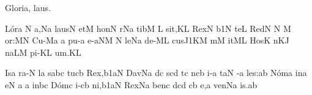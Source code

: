 \beginhymn Gloria, laus.


\Internote
\nosolesmescustos
\initiumgregorianum
%
\sgn L{\'o}r\punctum a\egn
{}\punctum N\egn
\sgn {}a{,}\pes Na\egn
\spatium
\sgn l{au}s\bivirga N\egn
\spatium
\sgn {}et\punctum M\egn
\spatium
\sgn h{o}n\punctum N\egn
{}r\pes Na\egn
\spatium
\sgn t{i}b\punctum M\egn
{}\punctum L\egn
\spatium
\sgn si{t,}\punctum K\augmentum L\egn
\spatium
\divisiominima
\spatium
\sgn Rex\punctum N\egn
\spatium
{}\episem b1\punctum N\egn
\sgn te{}\punctum L\egn
\spatium
\sgn Red\punctum N\egn
{}\bivirga N\egn
\custos M
\lineaproxima
{}o{r:}\engl{}\punctum M\augmentum N\egn
\spatium
\divisiomaior
\spatium
\sgn C{u}{-}\pes Ma\egn
{}\punctum a\egn
\spatium
\sgn pu{-}\punctum a\egn
\sgn {}e{-}\climacus aNM\egn
{}\punctum N\egn
\sgn le{}\pes Na\egn
\spatium
\sgn d{e}-\clivis ML\egn
\sgn cu{s}\episem J1\pes KM\egn
\spatium
\divisiominima
\spatium
m\punctum M\egn
{}it\clivis ML\egn
\spatium
\sgn Hos\punctum K\egn
{}n\cephalicus KJ\egn
\sgn na{}\pes LM\egn
\spatium
\sgn p{i}-\punctum K\augmentum L\egn
\sgn {}u{m.}\punctum K\augmentum L\egn
\spatium
\Finisgregoriana


\bigskip

\nosolesmescustos
\initiumgregorianum
%
\sgn {}Is\punctum a\egn
\sgn ra-\punctum N\egn
{}l\punctum a\egn
\spatium
{}s\punctum a\nonspatium\quilismapes bc\egn
\spatium
\sgn tu{}\clivis cb\egn
\spatium
\sgn Re{x,}\episem b1\clivis aN\egn
\spatium
\divisiominima
\spatium
\sgn Dav\pes Na\egn
\sgn {}{\'\i}d\punctum c\egn
{}s\pes cd\egn
\spatium
{}t\punctum c\egn
\spatium
\sgn {}{\'\i}n\cephalicus cb\egn
{}i-\punctum a\egn
\sgn ta{}\punctum N\egn
\spatium
{}-\punctum a\egn
\sgn le{s:}\punctum a\augmentum b\egn
\spatium
\divisiomaior
\spatium
\sgn N{\'o}m\punctum a\egn
\sgn {}in\punctum a\egn
\sgn {}e{}\punctum N\egn
\spatium
\custos a
\lineaproxima
{}\punctum a\egn
\spatium
\sgn {}in\quilismapes bc\egn
\spatium
\sgn D{\'o}m\punctum c\egn
\sgn {}i-\clivis cb\egn
\sgn ni,\episem b1\clivis aN\egn
\spatium
\divisiominima
\spatium
\sgn Rex\pes Na\egn
\spatium
\sgn ben\punctum c\egn
{}d\pes cd\egn
{}\clivis cb\egn
\sgn {}e,\punctum a\egn
\spatium
\sgn v{e}n\pes Na\egn
\sgn {}i{s.}\punctum a\augmentum b\egn
\spatium
\Finisgregoriana

